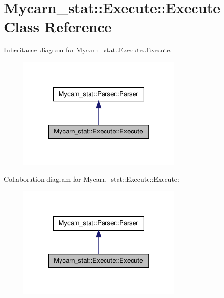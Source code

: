 \hypertarget{classMycarn__stat_1_1Execute_1_1Execute}{
\section{\-Mycarn\-\_\-stat\-:\-:\-Execute\-:\-:\-Execute \-Class \-Reference}
\label{classMycarn__stat_1_1Execute_1_1Execute}
}


\-Inheritance diagram for \-Mycarn\-\_\-stat\-:\-:\-Execute\-:\-:\-Execute\-:
\nopagebreak
\begin{figure}[H]
\begin{center}
\leavevmode
\includegraphics[width=234pt]{classMycarn__stat_1_1Execute_1_1Execute__inherit__graph}
\end{center}
\end{figure}


\-Collaboration diagram for \-Mycarn\-\_\-stat\-:\-:\-Execute\-:\-:\-Execute\-:
\nopagebreak
\begin{figure}[H]
\begin{center}
\leavevmode
\includegraphics[width=234pt]{classMycarn__stat_1_1Execute_1_1Execute__coll__graph}
\end{center}
\end{figure}
